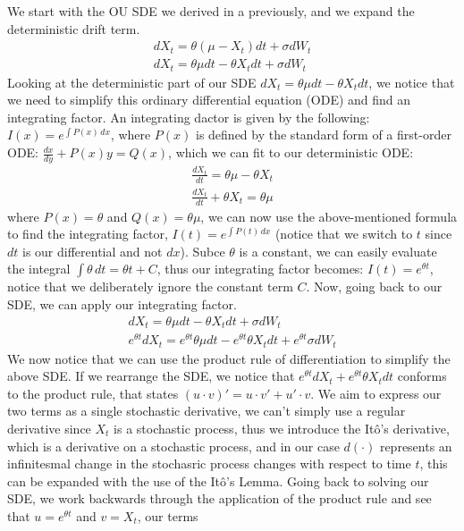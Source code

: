 \documentclass{article}
\begin{document}
\begin{spacing}{2.0}
We start with the OU SDE we derived in a previously, and we expand the deterministic drift term.
\begin{gather*}
    dX_{t} = \theta (\mu - X_{t})dt + \sigma dW_{t} \\
    dX_{t} = \theta \mu dt - \theta X_{t} dt + \sigma dW_{t}
\end{gather*}
Looking at the deterministic part of our SDE $dX_{t} = \theta \mu dt - \theta X_{t} dt$, we notice that we need to simplify this ordinary differential equation (ODE) and
find an integrating factor. An integrating dactor is given by the following: $I(x) = e^{\int P(x) \, dx}$, where $P(x)$ is defined by the standard form of a first-order ODE:
$\frac{dx}{dy} + P(x) y = Q(x)$, which we can fit to our deterministic ODE:
\begin{gather*}
    \frac{dX_{t}}{dt} = \theta \mu - \theta X_{t} \\
    \frac{dX_{t}}{dt} + \theta X_{t} = \theta \mu
\end{gather*}
where ${P(x) = \theta}$ and $Q(x) = \theta \mu$, we can now use the above-mentioned formula to find the integrating factor, $I(t) = e^{\int P(t) \, dx}$ (notice that
we switch to $t$ since $dt$ is our differential and not $dx$). Subce $\theta$ is a constant, we can easily evaluate the integral $\int \theta \, dt = \theta t + C$,
thus our integrating factor becomes: $I(t) = e^{\theta t}$, notice that we deliberately ignore the constant term $C$. Now, going back to our SDE, we can apply our
integrating factor.
\begin{gather*}
    dX_{t} = \theta \mu dt - \theta X_{t} dt + \sigma dW_{t} \\
    e^{\theta t} dX_{t} = e^{\theta t} \theta \mu dt -  e^{\theta t} \theta X_{t} dt + e^{\theta t} \sigma dW_{t}
\end{gather*}
We now notice that we can use the product rule of differentiation to simplify the above SDE. If we rearrange the SDE, we notice that
$e^{\theta t} dX_{t} + e^{\theta t} \theta X_{t} dt$ conforms to the product rule, that states $(u \cdot v)' = u \cdot v' + u' \cdot v$. We aim to express our two terms
as a single stochastic derivative, we can't simply use a regular derivative since $X_{t}$ is a stochastic process, thus we introduce the Itô's derivative, which is a derivative
on a stochastic process, and in our case $d(\cdot)$ represents an infinitesmal change in the stochasric process changes with respect to time $t$, this can be expanded with the
use of the Itô's Lemma. Going back to solving our SDE, we work backwards through the application of the product rule and see that $u = e^{\theta t}$ and $v = X_{t}$, our terms

\end{spacing}
\end{document}
